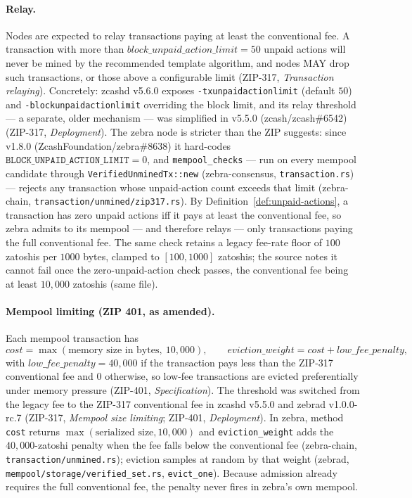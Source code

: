 \documentclass[11pt,a4paper]{article}
\theoremstyle{definition}
\begin{document}
\paragraph{Relay.} Nodes are expected to relay transactions paying at
least the conventional fee. A transaction with more than
$\mathit{block\_unpaid\_action\_limit} = 50$ unpaid actions will never be
mined by the recommended template algorithm, and nodes MAY drop such
transactions, or those above a configurable limit (ZIP-317,
\emph{Transaction relaying}). Concretely: \textsf{zcashd} v5.6.0 exposes
\texttt{-txunpaidactionlimit} (default $50$) and
\texttt{-blockunpaidactionlimit} overriding the block limit, and its
relay threshold --- a separate, older mechanism --- was simplified in
v5.5.0 (zcash/zcash\#6542) (ZIP-317, \emph{Deployment}). The
\textsf{zebra} node is stricter than the ZIP suggests: since v1.8.0
(ZcashFoundation/zebra\#8638) it hard-codes
$\texttt{BLOCK\_UNPAID\_ACTION\_LIMIT} = 0$, and
\texttt{mempool\_checks} --- run on every mempool candidate through
\texttt{VerifiedUnminedTx::new} (\textsf{zebra-consensus},
\texttt{transaction.rs}) --- rejects any transaction whose unpaid-action
count exceeds that limit (\textsf{zebra-chain},
\texttt{transaction/unmined/zip317.rs}). By
Definition~\ref{def:unpaid-actions}, a transaction has zero unpaid
actions iff it pays at least the conventional fee, so \textsf{zebra}
admits to its mempool --- and therefore relays --- only transactions
paying the full conventional fee. The same check retains a legacy
fee-rate floor of $100$ zatoshis per $1000$ bytes, clamped to
$[100, 1000]$ zatoshis; the source notes it cannot fail once the
zero-unpaid-action check passes, the conventional fee being at least
$10{,}000$ zatoshis (same file).

\paragraph{Mempool limiting (ZIP 401, as amended).} Each mempool
transaction has
\[
\mathit{cost} = \max(\text{memory size in bytes},\ 10{,}000),
\qquad
\mathit{eviction\_weight} = \mathit{cost} + \mathit{low\_fee\_penalty},
\]
with $\mathit{low\_fee\_penalty} = 40{,}000$ if the transaction pays less
than the ZIP-317 conventional fee and $0$ otherwise, so low-fee
transactions are evicted preferentially under memory pressure (ZIP-401,
\emph{Specification}). The threshold was switched from the legacy fee to
the ZIP-317 conventional fee in \textsf{zcashd} v5.5.0 and \textsf{zebrad}
v1.0.0-rc.7 (ZIP-317, \emph{Mempool size limiting}; ZIP-401,
\emph{Deployment}). In \textsf{zebra}, method \texttt{cost} returns
$\max(\text{serialized size}, 10{,}000)$ and \texttt{eviction\_weight}
adds the $40{,}000$-zatoshi penalty when the fee falls below the
conventional fee (\textsf{zebra-chain}, \texttt{transaction/unmined.rs});
eviction samples at random by that weight (\textsf{zebrad},
\texttt{mempool/storage/verified\_set.rs}, \texttt{evict\_one}). Because
admission already requires the full conventional fee, the penalty never
fires in \textsf{zebra}'s own mempool.
\end{document}
